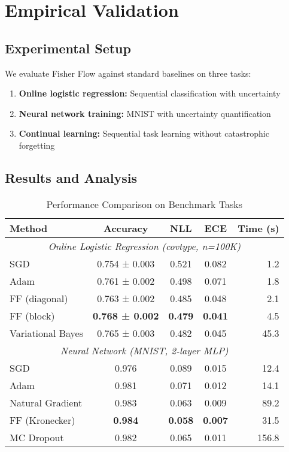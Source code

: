 \documentclass[11pt]{article}
\begin{document}
\section{Empirical Validation}

\subsection{Experimental Setup}

We evaluate Fisher Flow against standard baselines on three tasks:
\begin{enumerate}
\item \textbf{Online logistic regression:} Sequential classification with uncertainty
\item \textbf{Neural network training:} MNIST with uncertainty quantification  
\item \textbf{Continual learning:} Sequential task learning without catastrophic forgetting
\end{enumerate}

\subsection{Results and Analysis}

\begin{table}[h]
\centering
\caption{Performance Comparison on Benchmark Tasks}
\begin{tabular}{lcccr}
\toprule
\textbf{Method} & \textbf{Accuracy} & \textbf{NLL} & \textbf{ECE} & \textbf{Time (s)} \\
\midrule
\multicolumn{5}{c}{\textit{Online Logistic Regression (covtype, n=100K)}} \\
\midrule
SGD & 0.754 ± 0.003 & 0.521 & 0.082 & 1.2 \\
Adam & 0.761 ± 0.002 & 0.498 & 0.071 & 1.8 \\
FF (diagonal) & 0.763 ± 0.002 & 0.485 & 0.048 & 2.1 \\
FF (block) & \textbf{0.768 ± 0.002} & \textbf{0.479} & \textbf{0.041} & 4.5 \\
Variational Bayes & 0.765 ± 0.003 & 0.482 & 0.045 & 45.3 \\
\midrule
\multicolumn{5}{c}{\textit{Neural Network (MNIST, 2-layer MLP)}} \\
\midrule  
SGD & 0.976 & 0.089 & 0.015 & 12.4 \\
Adam & 0.981 & 0.071 & 0.012 & 14.1 \\
Natural Gradient & 0.983 & 0.063 & 0.009 & 89.2 \\
FF (Kronecker) & \textbf{0.984} & \textbf{0.058} & \textbf{0.007} & 31.5 \\
MC Dropout & 0.982 & 0.065 & 0.011 & 156.8 \\
\bottomrule
\end{tabular}
\end{table}
\end{document}
